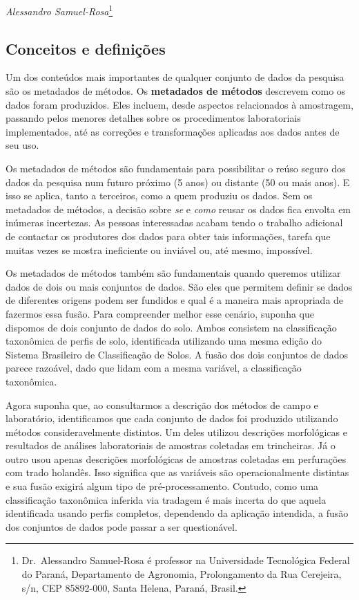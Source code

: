 \documentclass[a4paper,dvipsnames]{tufte-book}
\begin{document}
\emph{Alessandro Samuel-Rosa}\footnote{Dr.~Alessandro Samuel-Rosa é
  professor na Universidade Tecnológica Federal do Paraná, Departamento
  de Agronomia, Prolongamento da Rua Cerejeira, s/n, CEP 85892-000,
  Santa Helena, Paraná, Brasil.}

\subsection{Conceitos e definições}\label{conceitos-e-definiuxe7uxf5es}

Um dos conteúdos mais importantes de qualquer conjunto de dados da
pesquisa são os metadados de métodos. Os \textbf{metadados de métodos}
descrevem como os dados foram produzidos. Eles incluem, desde aspectos
relacionados à amostragem, passando pelos menores detalhes sobre os
procedimentos laboratoriais implementados, até as correções e
transformações aplicadas aos dados antes de seu uso.

Os metadados de métodos são fundamentais para possibilitar o reúso
seguro dos dados da pesquisa num futuro próximo (5 anos) ou distante (50
ou mais anos). E isso se aplica, tanto a terceiros, como a quem produziu
os dados. Sem os metadados de métodos, a decisão sobre \emph{se} e
\emph{como} reusar os dados fica envolta em inúmeras incertezas. As
pessoas interessadas acabam tendo o trabalho adicional de contactar os
produtores dos dados para obter tais informações, tarefa que muitas
vezes se mostra ineficiente ou inviável ou, até mesmo, impossível.

Os metadados de métodos também são fundamentais quando queremos utilizar
dados de dois ou mais conjuntos de dados. São eles que permitem definir
se dados de diferentes origens podem ser fundidos e qual é a maneira
mais apropriada de fazermos essa fusão. Para compreender melhor esse
cenário, suponha que dispomos de dois conjunto de dados do solo. Ambos
consistem na classificação taxonômica de perfis de solo, identificada
utilizando uma mesma edição do Sistema Brasileiro de Classificação de
Solos. A fusão dos dois conjuntos de dados parece razoável, dado que
lidam com a mesma variável, a classificação taxonômica.

Agora suponha que, ao consultarmos a descrição dos métodos de campo e
laboratório, identificamos que cada conjunto de dados foi produzido
utilizando métodos consideravelmente distintos. Um deles utilizou
descrições morfológicas e resultados de análises laboratoriais de
amostras coletadas em trincheiras. Já o outro usou apenas descrições
morfológicas de amostras coletadas em perfurações com trado holandês.
Isso significa que as variáveis são operacionalmente distintas e sua
fusão exigirá algum tipo de pré-processamento. Contudo, como uma
classificação taxonômica inferida via tradagem é mais incerta do que
aquela identificada usando perfis completos, dependendo da aplicação
intendida, a fusão dos conjuntos de dados pode passar a ser
questionável.
\end{document}
